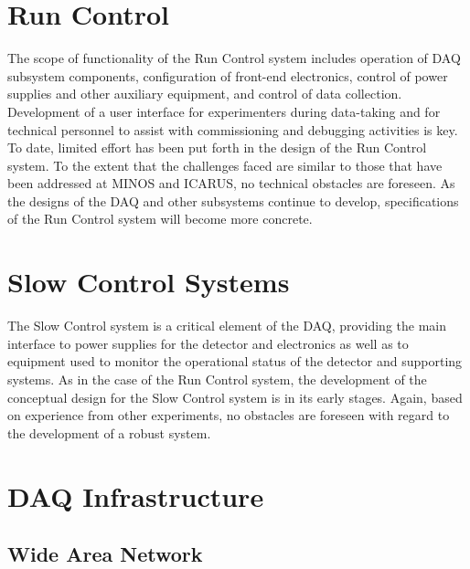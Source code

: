 \section{Run Control }
\label{sec:v5-trig-runcontrol}

The scope of 
functionality of the Run Control system includes operation of DAQ 
subsystem components, configuration 
of front-end electronics, control of power supplies and other auxiliary 
equipment, and control of data collection.  Development of a 
user interface for experimenters during data-taking and for technical 
personnel to assist with commissioning and debugging activities is key.  To date, 
limited effort has been put forth in the design of the Run Control system.
To the extent that the challenges faced are similar to those that have 
been addressed at MINOS and ICARUS, no technical obstacles are foreseen.  
As the designs of the DAQ and other subsystems continue to develop, 
specifications of the Run Control system will become more concrete.

\section{Slow Control Systems }
\label{sec:v5-trig-slowcontrol}

The Slow Control system is a critical element of the DAQ, providing the 
main interface to power supplies for the detector and electronics as well  
as to equipment used to monitor the operational status of the detector and 
supporting systems.  As in the case of the Run Control system, the 
development of the conceptual design for the Slow Control system is in 
its early stages.  Again, based on experience from other experiments, 
no obstacles are foreseen with regard to the development of a robust 
system.

\section{DAQ Infrastructure }
\label{sec:v5-trig-infrastructure}


\subsection{Wide Area Network}

